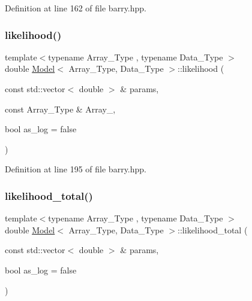 Definition at line 162 of file barry.\+hpp.

\mbox{\label{classbarry_1_1_model_adf2c30d9c5ffdc87af6813d110146968}} 
\subsubsection{\texorpdfstring{likelihood()}{likelihood()}\hspace{0.1cm}{\footnotesize\ttfamily [2/2]}}
{\footnotesize\ttfamily template$<$typename Array\+\_\+\+Type , typename Data\+\_\+\+Type $>$ \\
double \hyperlink{classbarry_1_1_model}{Model}$<$ Array\+\_\+\+Type, Data\+\_\+\+Type $>$\+::likelihood (\begin{DoxyParamCaption}\item[{const std\+::vector$<$ double $>$ \&}]{params,  }\item[{const Array\+\_\+\+Type \&}]{Array\+\_\+,  }\item[{bool}]{as\+\_\+log = {\ttfamily false} }\end{DoxyParamCaption})\hspace{0.3cm}{\ttfamily [inline]}}



Definition at line 195 of file barry.\+hpp.

\mbox{\label{classbarry_1_1_model_a2fe9cf412c5b2323c35c18952f9cb09d}} 
\subsubsection{\texorpdfstring{likelihood\+\_\+total()}{likelihood\_total()}}
{\footnotesize\ttfamily template$<$typename Array\+\_\+\+Type , typename Data\+\_\+\+Type $>$ \\
double \hyperlink{classbarry_1_1_model}{Model}$<$ Array\+\_\+\+Type, Data\+\_\+\+Type $>$\+::likelihood\+\_\+total (\begin{DoxyParamCaption}\item[{const std\+::vector$<$ double $>$ \&}]{params,  }\item[{bool}]{as\+\_\+log = {\ttfamily false} }\end{DoxyParamCaption})\hspace{0.3cm}{\ttfamily [inline]}}



